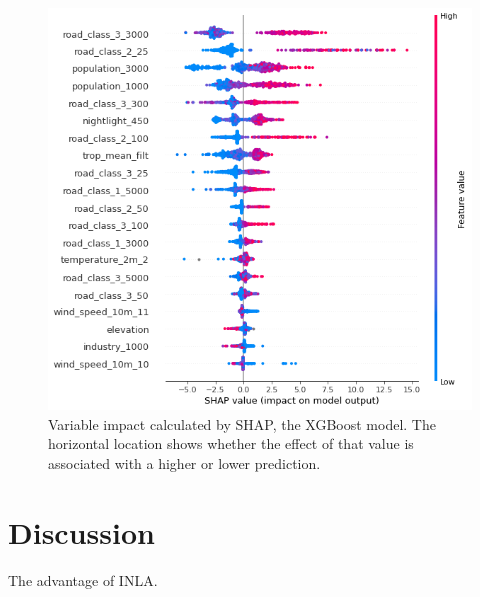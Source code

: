 \documentclass{article}
\begin{document}
\begin{figure}
\centering
\includegraphics[scale = 0.5]{fig/xgbshap.png}
\caption{Variable impact calculated by SHAP, the XGBoost model. The horizontal location shows whether the effect of that value is associated with a higher or lower prediction.}
\label{xgbshap}
\end{figure}


\section{Discussion}
The advantage of INLA.


\newpage


\end{document}
